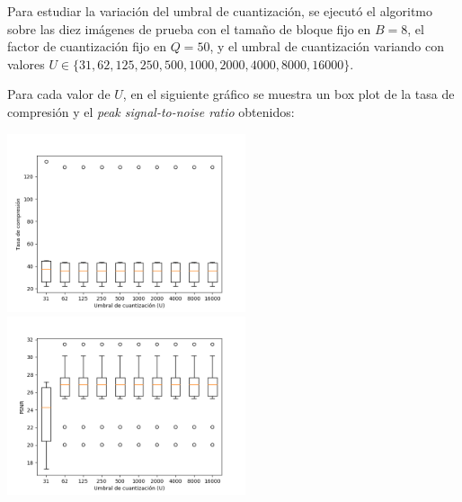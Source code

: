 \documentclass{article}
\newcommand{\set}[1]{\{#1\}}
\begin{document}
Para estudiar la variación del umbral de cuantización, se ejecutó el
algoritmo sobre las diez imágenes de prueba con el
tamaño de bloque fijo en $B = 8$,
el factor de cuantización fijo en $Q = 50$,
y el umbral de cuantización variando con valores
$U \in \set{31, 62, 125, 250, 500, 1000, 2000, 4000, 8000, 16000}$.

Para cada valor de $U$, en el siguiente gráfico se muestra un
box plot de la tasa de compresión y el
{\em peak signal-to-noise ratio} obtenidos:\\
\begin{center}
\includegraphics[width=7cm]{../imgs/output/gray_plots/u_rate.png}
\includegraphics[width=7cm]{../imgs/output/gray_plots/u_psnr.png}
\end{center}
\end{document}
